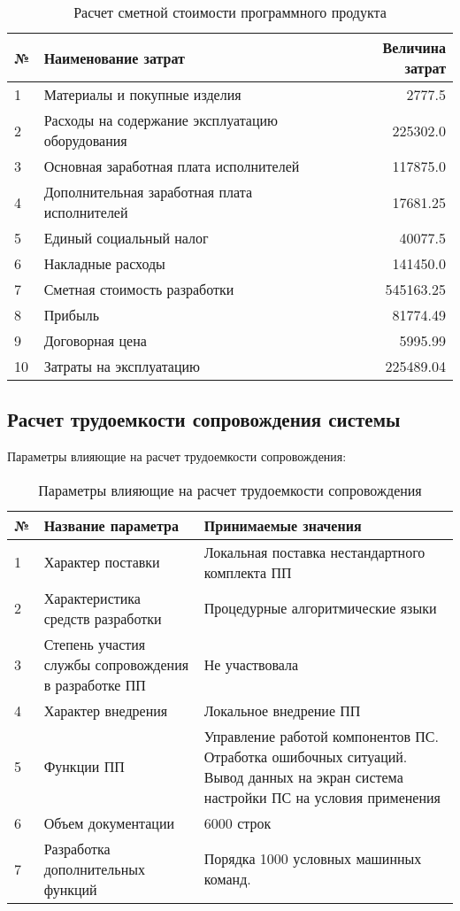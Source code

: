 \begin{table}[H]
\caption{Расчет сметной стоимости программного продукта}
\begin{tabular}{|l|p{12cm}|r|}
\hline{}
№ & Наименование затрат & Величина затрат \\
\hline{}
1 & Материалы и покупные изделия & 2777.5 \\
\hline{}
2 & Расходы на содержание эксплуатацию оборудования & 225302.0 \\
\hline{}
3 & Основная заработная плата исполнителей & 117875.0 \\
\hline{}
4 & Дополнительная заработная плата исполнителей & 17681.25 \\
\hline{}
5 & Единый социальный налог & 40077.5 \\
\hline{}
6 & Накладные расходы & 141450.0 \\
\hline{}
7 & Сметная стоимость разработки & 545163.25 \\
\hline{}
8 & Прибыль & 81774.49 \\
\hline{}
9 & Договорная цена & 5995.99 \\
\hline{}
10 & Затраты на эксплуатацию & 225489.04 \\
\hline
\end{tabular}
\label{table:softwareCost}
\end{table}



\subsection{Расчет трудоемкости сопровождения системы}
Параметры влияющие на расчет трудоемкости сопровождения:
\begin{table}[H]
\caption{Параметры влияющие на расчет трудоемкости сопровождения}
\begin{tabular}{|l|p{7.5cm}|p{7.5cm}|}
\hline{}
№ & Название параметра & Принимаемые значения \\
\hline{}
1 & Характер поставки & Локальная поставка нестандартного комплекта ПП \\
\hline{}
2 & Характеристика средств разработки & Процедурные алгоритмические языки \\
\hline{}
3 & Степень участия службы сопровождения в разработке ПП & Не участвовала \\
\hline{}
4 & Характер внедрения & Локальное внедрение ПП \\
\hline{}
5 & Функции ПП & Управление работой компонентов ПС. Отработка ошибочных ситуаций.
Вывод данных на экран система настройки ПС на условия применения \\
\hline{}
6 & Объем документации & 6000 строк \\
\hline{}
7 & Разработка дополнительных функций & Порядка 1000 условных машинных команд. \\
\hline
\end{tabular}
\label{table:supportFactors}
\end{table}


